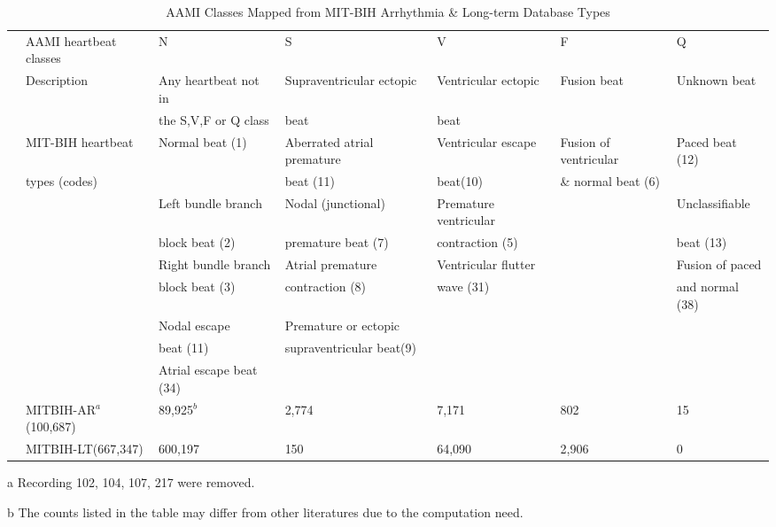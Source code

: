\documentclass[journal]{IEEEtran}
\begin{document}
\begin{table}[]
\begin{center}
\begin{threeparttable}
\caption{AAMI Classes Mapped from MIT-BIH Arrhythmia \& Long-term Database Types}
\label{Table1}
\begin{tabular}{cllllll}
\hline
& AAMI heartbeat classes & N & S & V & F & Q \\
& Description  &Any heartbeat not in & Supraventricular ectopic  & Ventricular ectopic  & Fusion beat & Unknown beat \\
&                     &the S,V,F or Q class & beat   		     & beat	      &	     &          \\
\hline
& MIT-BIH heartbeat  &Normal beat (1)            & Aberrated atrial premature & Ventricular escape & Fusion of ventricular& Paced beat (12)\\
&  types (codes)   &  					  &  beat (11)		    &  beat(10)	            & \& normal beat (6)		      &             \\

&                     &Left bundle branch   &  Nodal (junctional) &Premature ventricular& 	 &  Unclassifiable \\
&                     &block beat (2)            & premature beat (7)    &contraction (5)         &	   & beat (13)   \\

&                     & Right bundle branch & Atrial premature & Ventricular flutter &    &  Fusion of paced  \\
&                     & block beat (3) & contraction (8)     & wave (31) & 	   & and normal (38)  \\

&                     & Nodal escape  & Premature or ectopic & 	     &  &                          \\
&                     & beat (11)	  & supraventricular beat(9) &     &   &     \\

&                     & Atrial escape beat (34)   &  	  				      & 				            & 			      &                          \\
\hline
& MITBIH-AR$^a$(100,687) & 89,925$^b$   & 2,774   & 7,171   & 802    & 15        \\
& MITBIH-LT(667,347) & 600,197  &  150  & 64,090  & 	2,906   & 0       \\

\hline
\end{tabular}
\begin{tablenotes}
\item [a] Recording 102, 104, 107, 217 were removed.
\item [b] The counts listed in the table may differ from other literatures \cite{chaza} due to the computation need.
\end{tablenotes}
\end{threeparttable}

\end{center}
     \end{table}
\end{document}
